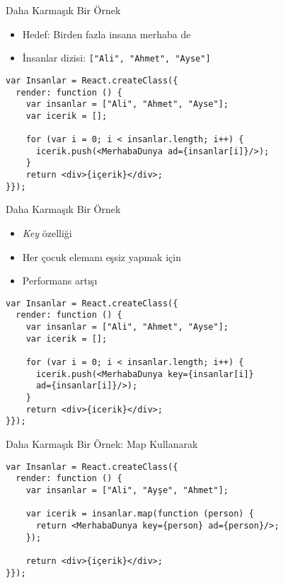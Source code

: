 \documentclass[presentation]{beamer}
\begin{document}
\begin{frame}[fragile,label={sec:orgf17086e}]{Daha Karmaşık Bir Örnek}
 \begin{itemize}
\item Hedef: Birden fazla insana merhaba de
\item İnsanlar dizisi: \texttt{["Ali", "Ahmet", "Ayse"]}
\end{itemize}

\begin{verbatim}
var Insanlar = React.createClass({
  render: function () {
    var insanlar = ["Ali", "Ahmet", "Ayse"];
    var icerik = [];

    for (var i = 0; i < insanlar.length; i++) {
      icerik.push(<MerhabaDunya ad={insanlar[i]}/>);
    }
    return <div>{içerik}</div>;
}});
\end{verbatim}
\end{frame}

\begin{frame}[fragile,label={sec:org59988dc}]{Daha Karmaşık Bir Örnek}
 \begin{itemize}
\item \emph{Key} özelliği
\item Her çocuk elemanı eşsiz yapmak için
\item Performans artışı
\end{itemize}

\begin{verbatim}
var Insanlar = React.createClass({
  render: function () {
    var insanlar = ["Ali", "Ahmet", "Ayse"];
    var icerik = [];

    for (var i = 0; i < insanlar.length; i++) {
      icerik.push(<MerhabaDunya key={insanlar[i]}
      ad={insanlar[i]}/>);
    }
    return <div>{icerik}</div>;
}});
\end{verbatim}
\end{frame}

\begin{frame}[fragile,label={sec:org8daff30}]{Daha Karmaşık Bir Örnek: Map Kullanarak}
 \begin{verbatim}
var Insanlar = React.createClass({
  render: function () {
    var insanlar = ["Ali", "Ayşe", "Ahmet"];

    var icerik = insanlar.map(function (person) {
      return <MerhabaDunya key={person} ad={person}/>;
    });

    return <div>{içerik}</div>;
}});
\end{verbatim}
\end{frame}
\end{document}
